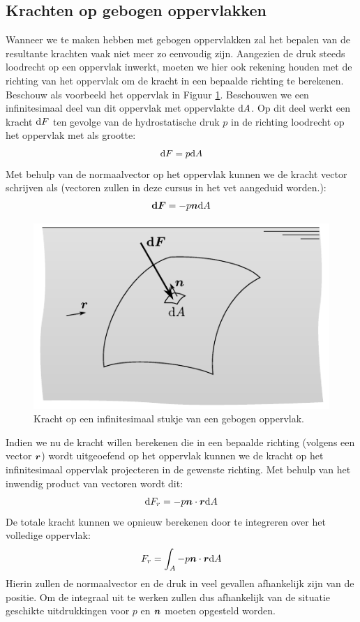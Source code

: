 		\subsection{Krachten op gebogen oppervlakken}
Wanneer we te maken hebben met gebogen oppervlakken zal het bepalen van de resultante krachten vaak niet meer zo eenvoudig zijn. Aangezien de druk steeds loodrecht op een oppervlak inwerkt, moeten we hier ook rekening houden met de richting van het oppervlak om de kracht in een bepaalde richting te berekenen. Beschouw als voorbeeld het oppervlak in Figuur \ref{fig:kracht_gebogen_oppervlak}. Beschouwen we een infinitesimaal deel van dit oppervlak met oppervlakte $\mathrm{d} A$. Op dit deel werkt een kracht $\mathrm{d} F$ ten gevolge van de hydrostatische druk $p$ in de richting loodrecht op het oppervlak met als grootte:
\begin{equation}
	\mathrm{d} F = p \mathrm{d} A
\end{equation}
Met behulp van de normaalvector op het oppervlak kunnen we de kracht vector schrijven als (vectoren zullen in deze cursus in het vet aangeduid worden.):
\begin{equation}
	\boldsymbol{\mathrm{d} F} = -p \boldsymbol{n} \mathrm{d} A
\end{equation}
\begin{figure}[htb]
	\centering
	\includegraphics{fig/hydrostatica/kracht_gebogen_oppervlak}
	\caption{Kracht op een infinitesimaal stukje van een gebogen oppervlak.}
	\label{fig:kracht_gebogen_oppervlak}
\end{figure}
Indien we nu de kracht willen berekenen die in een bepaalde richting (volgens een vector $\boldsymbol{r}$) wordt uitgeoefend op het oppervlak kunnen we de kracht op het infinitesimaal oppervlak projecteren in de gewenste richting. Met behulp van het inwendig product van vectoren wordt dit:
\begin{equation}
	\mathrm{d} F_r = -p \boldsymbol{n} \cdot \boldsymbol{r} \mathrm{d} A
\end{equation}
De totale kracht kunnen we opnieuw berekenen door te integreren over het volledige oppervlak:
\begin{equation}
	F_r = \int_A -p \boldsymbol{n} \cdot \boldsymbol{r} \mathrm{d} A
\end{equation}
Hierin zullen de normaalvector en de druk in veel gevallen afhankelijk zijn van de positie. Om de integraal uit te werken zullen dus afhankelijk van de situatie geschikte uitdrukkingen voor $p$ en $\boldsymbol{n}$ moeten opgesteld worden.

